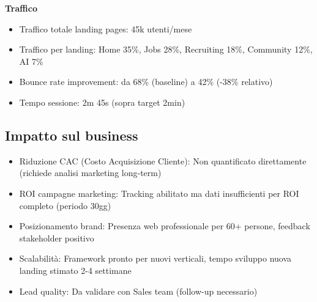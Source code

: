 \textbf{Traffico}
\begin{itemize}
  \item Traffico totale landing pages: 45k utenti/mese
  \item Traffico per landing: Home 35\%, Jobs 28\%, Recruiting 18\%, 
        Community 12\%, AI 7\%
  \item Bounce rate improvement: da 68\% (baseline) a 42\% (-38\% 
        relativo)
  \item Tempo sessione: 2m 45s (sopra target 2min)
\end{itemize}

\subsection{Impatto sul business}
\begin{itemize}
  \item Riduzione CAC (Costo Acquisizione Cliente): Non quantificato 
        direttamente (richiede analisi marketing long-term)
  \item ROI campagne marketing: Tracking abilitato ma dati insufficienti 
        per ROI completo (periodo 30gg)
  \item Posizionamento brand: Presenza web professionale per 60+ persone, 
        feedback stakeholder positivo
  \item Scalabilità: Framework pronto per nuovi verticali, tempo 
        sviluppo nuova landing stimato 2-4 settimane
  \item Lead quality: Da validare con Sales team (follow-up necessario)
\end{itemize}